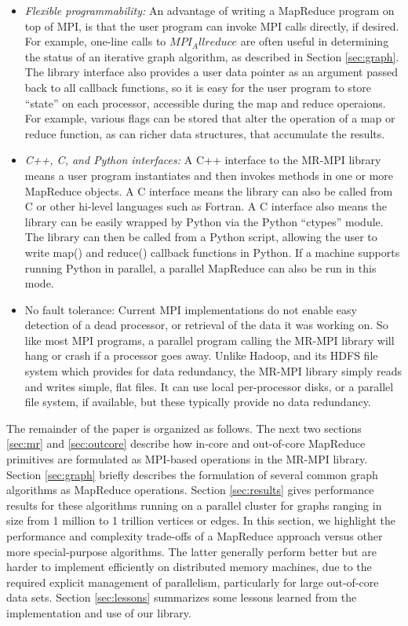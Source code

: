 \begin{itemize}
\item {\it Flexible programmability:} An advantage of writing a
MapReduce program on top of MPI, is that the user program can invoke
MPI calls directly, if desired.  For example, one-line calls to
$MPI_Allreduce$ are often useful in determining the status of an
iterative graph algorithm, as described in Section \ref{sec:graph}.
The library interface also provides a user data pointer as an argument
passed back to all callback functions, so it is easy for the user
program to store ``state'' on each processor, accessible during the
map and reduce operaions.  For example, various flags can be stored
that alter the operation of a map or reduce function, as can richer
data structures, that accumulate the results.

\item {\it C++, C, and Python interfaces:} A C++ interface to the
MR-MPI library means a user program instantiates and then invokes
methods in one or more MapReduce objects.  A C interface means the
library can also be called from C or other hi-level languages such as
Fortran.  A C interface also means the library can be easily wrapped
by Python via the Python ``ctypes'' module.  The library can then be
called from a Python script, allowing the user to write map() and
reduce() callback functions in Python.  If a machine supports running
Python in parallel, a parallel MapReduce can also be run in this mode.

\item {No fault tolerance:} Current MPI implementations do not enable
easy detection of a dead processor, or retrieval of the data it was
working on.  So like most MPI programs, a parallel program calling the
MR-MPI library will hang or crash if a processor goes away.  Unlike
Hadoop, and its HDFS file system which provides for data redundancy,
the MR-MPI library simply reads and writes simple, flat files.  It can
use local per-processor disks, or a parallel file system, if
available, but these typically provide no data redundancy.

\end{itemize}

The remainder of the paper is organized as follows.  The next two
sections \ref{sec:mr} and \ref{sec:outcore} describe how in-core and
out-of-core MapReduce primitives are formulated as MPI-based
operations in the MR-MPI library.  Section \ref{sec:graph} briefly
describes the formulation of several common graph algorithms as
MapReduce operations.  Section \ref{sec:results} gives performance
results for these algorithms running on a parallel cluster for graphs
ranging in size from 1 million to 1 trillion vertices or edges.  In
this section, we highlight the performance and complexity trade-offs
of a MapReduce approach versus other more special-purpose algorithms.
The latter generally perform better but are harder to implement
efficiently on distributed memory machines, due to the required
explicit management of parallelism, particularly for large out-of-core
data sets.  Section \ref{sec:lessons} summarizes some lessons learned
from the implementation and use of our library.
